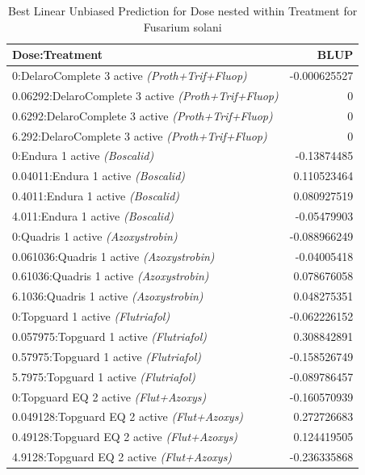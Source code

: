 \documentclass[
  10pt,
  letterpaper,
  twocolumn]{article}
\begin{document}
\vspace{0.1cm}

\begin{table}[ht]
\centering
\small
\caption{Best Linear Unbiased Prediction for Dose nested within Treatment for Fusarium solani }
\renewcommand{\arraystretch}{1.2}
\begin{tabular}{|p{6.4cm}|r|}
\hline
\textbf{Dose:Treatment} & \textbf{BLUP} \\
\hline
0:DelaroComplete 3 active \textit{(Proth+Trif+Fluop)} & -0.000625527 \\
0.06292:DelaroComplete 3 active \textit{(Proth+Trif+Fluop)} & 0\\
0.6292:DelaroComplete 3 active \textit{(Proth+Trif+Fluop)} & 0 \\
6.292:DelaroComplete 3 active \textit{(Proth+Trif+Fluop)} & 0 \\
0:Endura 1 active \textit{(Boscalid)} & -0.13874485 \\
0.04011:Endura 1 active \textit{(Boscalid)} & 0.110523464 \\
0.4011:Endura 1 active \textit{(Boscalid)} & 0.080927519 \\
4.011:Endura 1 active \textit{(Boscalid)} & -0.05479903 \\
0:Quadris 1 active \textit{(Azoxystrobin)} & -0.088966249 \\
0.061036:Quadris 1 active \textit{(Azoxystrobin)} & -0.04005418 \\
0.61036:Quadris 1 active \textit{(Azoxystrobin)} & 0.078676058 \\
6.1036:Quadris 1 active \textit{(Azoxystrobin)} & 0.048275351 \\
0:Topguard 1 active \textit{(Flutriafol)} & -0.062226152\\
0.057975:Topguard 1 active \textit{(Flutriafol)} & 0.308842891 \\
0.57975:Topguard 1 active \textit{(Flutriafol)} & -0.158526749 \\
5.7975:Topguard 1 active \textit{(Flutriafol)} & -0.089786457 \\
0:Topguard EQ 2 active \textit{(Flut+Azoxys)} & -0.160570939 \\
0.049128:Topguard EQ 2 active \textit{(Flut+Azoxys)} & 0.272726683 \\
0.49128:Topguard EQ 2 active \textit{(Flut+Azoxys)} & 0.124419505 \\
4.9128:Topguard EQ 2 active \textit{(Flut+Azoxys)} & -0.236335868 \\
\hline
\end{tabular}
\end{table}
\end{document}
